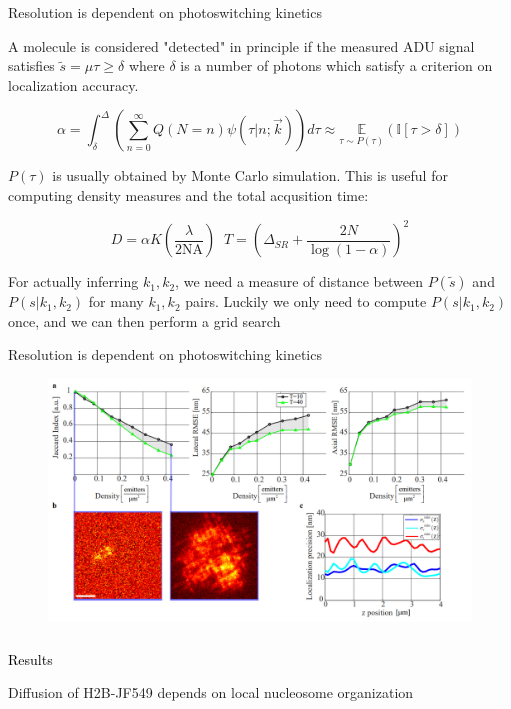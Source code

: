\documentclass{beamer}					%
\begin{document}
\begin{frame}{Resolution is dependent on photoswitching kinetics}

A molecule is considered "detected" in principle if the measured ADU signal satisfies $\tilde{s} =\mu\tau \geq \delta$ where $\delta$ is a number of photons which satisfy a criterion on localization accuracy.

\begin{equation*}
\alpha = \int_{\delta}^{\Delta}\left(\sum_{n=0}^{\infty}Q(N=n)\psi(\tau|n;\vec{k})\right)d\tau \approx \underset{\tau\sim P(\tau)}{\mathbb{E}}\left(\mathbb{I}[\tau > \delta]\right)
\end{equation*}

$P(\tau)$ is usually obtained by Monte Carlo simulation. This is useful for computing density measures and the total acqusition time:

\begin{equation*}
D = \alpha K\left(\frac{\lambda}{2\mathrm{NA}}\right)\;\; T = \left(\Delta_{SR}+\frac{2N}{\log(1-\alpha)}\right)^{2}
\end{equation*}

For actually inferring $k_{1},k_{2}$, we need a measure of distance between $P(\tilde{s})$ and $P(s|k_{1},k_{2})$ for many $k_{1},k_{2}$ pairs. Luckily we only need to compute $P(s|k_{1},k_{2})$ once, and we can then perform a grid search

\end{frame}

\begin{frame}{Resolution is dependent on photoswitching kinetics}
\begin{figure}
\includegraphics[width=12cm]{Jaccard.png}
\end{figure}
\end{frame}


\begin{frame}
\frametitle{}
\centering
\Large \textcolor{black}{Results}
\end{frame}

\begin{frame}{Diffusion of H2B-JF549 depends on local nucleosome organization}

\end{frame}
\end{document}
